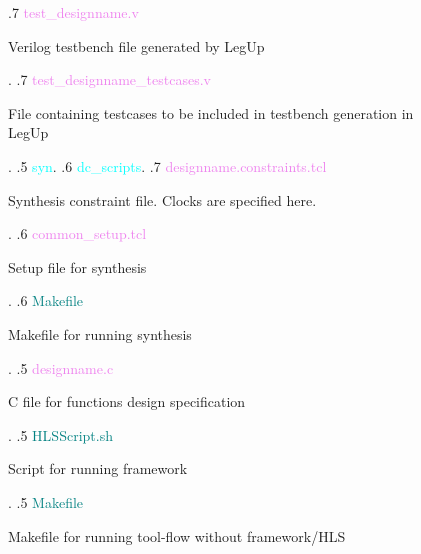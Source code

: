 \begin{figure}
\begin{minipage}{0.99\textwidth}
{    .7 \textcolor{violet}{test\_designname{.}v} \dotfill \:\:\begin{minipage}[t]{6cm}
                                                    Verilog testbench file generated by LegUp
                                                    \end{minipage}.
    .7 \textcolor{violet}{test\_designname\_testcases{.}v} \dotfill \:\:\begin{minipage}[t]{6cm}
                                                    File containing testcases to be included in testbench generation in LegUp
                                                    \end{minipage}.
    .5 \textcolor{cyan}{syn}.
    .6 \textcolor{cyan}{dc\_scripts}.
    .7 \textcolor{violet}{designname{.}constraints{.}tcl} \dotfill \:\:\begin{minipage}[t]{5.4cm}
                                                            Synthesis constraint file{.} Clocks are specified here{.}
                                                            \end{minipage}.
    .6 \textcolor{violet}{common\_setup{.}tcl} \dotfill \:\:\begin{minipage}[t]{5.4cm}
                                                            Setup file for synthesis 
                                                            \end{minipage}.
    .6 \textcolor{teal}{Makefile} \dotfill \:\:\begin{minipage}[t]{5.4cm}
                                                            Makefile for running synthesis
                                                            \end{minipage}.
    .5 \textcolor{violet}{designname{.}c} \dotfill \:\:\begin{minipage}[t]{5.4cm}
                                                            C file for functions design specification
                                                            \end{minipage}.
    .5 \textcolor{teal}{HLSScript{.}sh} \dotfill \:\:\begin{minipage}[t]{5.4cm}
                                                            Script for running framework
                                                            \end{minipage}. 
    .5 \textcolor{teal}{Makefile} \dotfill \:\:\begin{minipage}[t]{5.4cm}
                                                            Makefile for running tool-flow without framework/HLS

\end{minipage}}
\end{minipage}
\end{figure}
